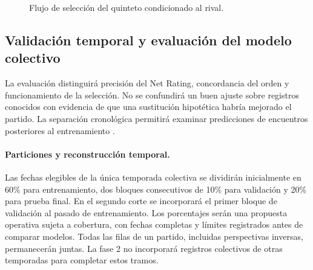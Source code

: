 \begin{figure}[htbp]
\centering
{}
\caption{Flujo de selección del quinteto condicionado al rival.}
\label{fig:seleccion-quinteto}
\end{figure}

\subsection{Validación temporal y evaluación del modelo colectivo}
\label{subsec:validacion-fase2}
La evaluación distinguirá precisión del Net Rating, concordancia del orden y funcionamiento de la selección. No se confundirá un buen ajuste sobre registros conocidos con evidencia de que una sustitución hipotética habría mejorado el partido. La separación cronológica permitirá examinar predicciones de encuentros posteriores al entrenamiento \cite{sklearnTemporal613}.

\paragraph*{Particiones y reconstrucción temporal.}
Las fechas elegibles de la única temporada colectiva se dividirán inicialmente en 60\% para entrenamiento, dos bloques consecutivos de 10\% para validación y 20\% para prueba final. En el segundo corte se incorporará el primer bloque de validación al pasado de entrenamiento. Los porcentajes serán una propuesta operativa sujeta a cobertura, con fechas completas y límites registrados antes de comparar modelos. Todas las filas de un partido, incluidas perspectivas inversas, permanecerán juntas. La fase 2 no incorporará registros colectivos de otras temporadas para completar estos tramos.

